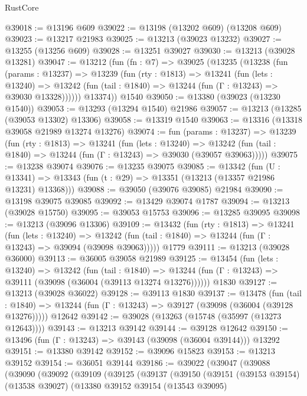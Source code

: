 \begin{lexlean}{RustCore}
\begin{coremodule}
@39018 := @13196 @609
@39022 := @13198 (@13202 @609) (@13208 @609)
@39023 := @13217 @21983
@39025 := @13213 (@39023 @13232)
@39027 := @13255 (@13256 @609)
@39028 := @13251 @39027
@39030 := @13213 (@39028 @13281)
@39047 := @13212
    (fun (fn : @7) =>
    @39025
      (@13235
        (@13238
          (fun (params : @13237) =>
          @13239
            (fun (rty : @1813) =>
            @13241
              (fun (lets : @13240) =>
              @13242 (fun (tail : @1840) => @13244 (fun (Γ : @13243) => @39030 @13328))))))
        @13374))
    @1540
@39050 := @13380 (@39023 (@13230 @1540))
@39053 := @13293 (@13294 @1540) @21986
@39057 := @13213 (@13285 (@39053 @13302) @13306)
@39058 := @13319 @1540
@39063 := @13316 (@13318 @39058 @21989 @13274 @13276)
@39074 := fun (params : @13237) =>
  @13239
    (fun (rty : @1813) =>
    @13241
      (fun (lets : @13240) =>
      @13242 (fun (tail : @1840) => @13244 (fun (Γ : @13243) => @39030 (@39057 @39063)))))
@39075 := @13238 @39074
@39076 := @13235 @39075
@39085 := @13342
    (fun (U : @13341) => @13343 (fun (t : @29) => @13351 (@13213 (@13357 @21986 @13231) @13368)))
@39088 := @39050 (@39076 @39085) @21984
@39090 := @13198 @39075 @39085
@39092 := @13429 @39074 @1787
@39094 := @13213 (@39028 @15750)
@39095 := @39053 @15753
@39096 := @13285 @39095
@39098 := @13213 (@39096 @13306)
@39109 := @13432
    (fun (rty : @1813) =>
    @13241
      (fun (lets : @13240) =>
      @13242 (fun (tail : @1840) => @13244 (fun (Γ : @13243) => @39094 (@39098 @39063)))))
    @1779
@39111 := @13213 (@39028 @36000)
@39113 := @36005 @39058 @21989
@39125 := @13454
    (fun (lets : @13240) =>
    @13242
      (fun (tail : @1840) =>
      @13244 (fun (Γ : @13243) => @39111 (@39098 (@36004 (@39113 @13274 @13276))))))
    @1830
@39127 := @13213 (@39028 @36022)
@39128 := @39113 @1830
@39137 := @13478
    (fun (tail : @1840) => @13244 (fun (Γ : @13243) => @39127 (@39098 (@36004 (@39128 @13276)))))
    @12642
@39142 := @39028 (@13263 (@15748 (@35997 (@13273 @12643))))
@39143 := @13213 @39142
@39144 := @39128 @12642
@39150 := @13496 (fun (Γ : @13243) => @39143 (@39098 (@36004 @39144))) @13292
@39151 := @13380 @39142
@39152 := @39096 @15823
@39153 := @13213 @39152
@39154 := @36051 @39144
@39186 := @39022
    (@39047
      (@39088
        (@39090
          (@39092
            (@39109
              (@39125
                (@39137
                  (@39150
                    (@39151
                      (@39153 @39154)
                      (@13538 @39027)
                      (@13380
                        @39152
                        @39154
                        (@13543 @39095)

\end{coremodule}
\end{lexlean}
